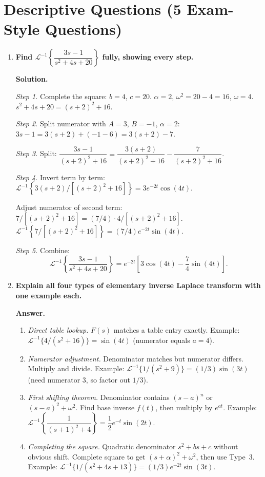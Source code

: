 \documentclass[12pt,a4paper]{article}
\begin{document}
\section{Descriptive Questions (5 Exam-Style Questions)}

\begin{enumerate}[leftmargin=*, label=\textbf{Q\arabic*.}]

\item \textbf{Find $\mathcal{L}^{-1}\!\left\{\dfrac{3s-1}{s^2+4s+20}\right\}$ fully,
      showing every step.}

\textbf{Solution.}

\textit{Step 1.} Complete the square: $b=4$, $c=20$.
$\alpha = 2$, $\omega^2 = 20 - 4 = 16$, $\omega = 4$.
$s^2+4s+20 = (s+2)^2+16$.

\textit{Step 2.} Split numerator with $A=3$, $B=-1$, $\alpha=2$:
$3s - 1 = 3(s+2) + (-1 - 6) = 3(s+2) - 7$.

\textit{Step 3.} Split:
$\dfrac{3s-1}{(s+2)^2+16} = \dfrac{3(s+2)}{(s+2)^2+16} - \dfrac{7}{(s+2)^2+16}$.

\textit{Step 4.} Invert term by term:
$\mathcal{L}^{-1}\!\left\{3(s+2)/[(s+2)^2+16]\right\} = 3e^{-2t}\cos(4t)$.

Adjust numerator of second term: $7/[(s+2)^2+16] = (7/4)\cdot 4/[(s+2)^2+16]$.
$\mathcal{L}^{-1}\!\left\{7/[(s+2)^2+16]\right\} = (7/4)e^{-2t}\sin(4t)$.

\textit{Step 5.} Combine:
\[
  \mathcal{L}^{-1}\!\left\{\frac{3s-1}{s^2+4s+20}\right\}
  = e^{-2t}\!\left[3\cos(4t) - \frac{7}{4}\sin(4t)\right].
\]

\item \textbf{Explain all four types of elementary inverse Laplace transform with one
      example each.}

\textbf{Answer.}
\begin{enumerate}[leftmargin=*, label=\textit{Type \arabic*.}]
  \item \textit{Direct table lookup.} $F(s)$ matches a table entry exactly.
        Example: $\mathcal{L}^{-1}\{4/(s^2+16)\} = \sin(4t)$ (numerator equals $a=4$).
  \item \textit{Numerator adjustment.} Denominator matches but numerator differs.
        Multiply and divide. Example: $\mathcal{L}^{-1}\{1/(s^2+9)\} = (1/3)\sin(3t)$
        (need numerator $3$, so factor out $1/3$).
  \item \textit{First shifting theorem.} Denominator contains $(s-a)^n$ or $(s-a)^2+\omega^2$.
        Find base inverse $f(t)$, then multiply by $e^{at}$.
        Example: $\mathcal{L}^{-1}\!\left\{\dfrac{1}{(s+1)^2+4}\right\} = \dfrac{1}{2}e^{-t}\sin(2t)$.
  \item \textit{Completing the square.} Quadratic denominator $s^2+bs+c$ without obvious
        shift. Complete square to get $(s+\alpha)^2+\omega^2$, then use Type~3.
        Example: $\mathcal{L}^{-1}\{1/(s^2+4s+13)\} = (1/3)e^{-2t}\sin(3t)$.
\end{enumerate}


\end{enumerate}
\end{document}
